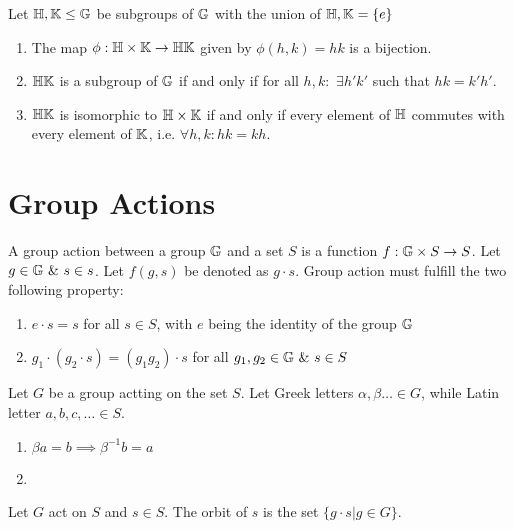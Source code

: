 \documentclass[../note.tex]{subfiles}
\begin{document}
\begin{theorem}
	Let $\mathbb{H}, \mathbb{K} \leq \mathbb{G}$ be subgroups of $\mathbb{G}$ with the union of $\mathbb{H}, \mathbb{K} = \{e\}$
	\begin{enumerate}
		\item The map $\phi: \mathbb{H}\times \mathbb{K} \rightarrow \mathbb{H}\mathbb{K}$ given by $\phi(h,k) = hk$ is a bijection.
		\item $\mathbb{H}\mathbb{K}$ is a subgroup of $\mathbb{G}$ if and only if for all $h, k: $ $\exists h' k'$ such that $hk = k'h'$.
		\item $\mathbb{H}\mathbb{K}$ is isomorphic to $\mathbb{H} \times \mathbb{K}$ if and only if every element of $\mathbb{H}$ commutes with every element of $\mathbb{K}$, i.e. $\forall h, k: hk=kh$.
	\end{enumerate}
\end{theorem}


\section{Group Actions}
\begin{definition}
	A group action between a group $\mathbb{G}$ and a set $S$ is a function $f: \mathbb{G}\times S \rightarrow S$. 
	Let $g\in \mathbb{G} \ \&\ s \in s$. Let $f(g,s)$ be denoted as $g\cdot s$. Group action must fulfill the two following property:
	\begin{enumerate}
		\item $e\cdot s=s$ for all $s\in S$, with $e$ being the identity of the group $\mathbb{G}$
		\item $g_1\cdot(g_2 \cdot s) = (g_1 g_2) \cdot s$ for all $g_1, g_2 \in \mathbb{G}\ \&\ s \in S$
	\end{enumerate}
\end{definition}

\begin{theorem}
	Let $G$ be a group actting on the set $S$. Let Greek letters $\alpha, \beta \dots \in G$, while Latin letter $a,b,c, \dots \in S$.
	\begin{enumerate}
		\item $\beta a = b \implies \beta^{-1} b = a$ 
		\item 
	\end{enumerate}
\end{theorem}
\begin{definition}[Orbit]
	Let $G$ act on $S$ and $s \in S$. The orbit of $s$ is the set $\{g\cdot s | g \in G\}$.	
\end{definition}
\end{document}
